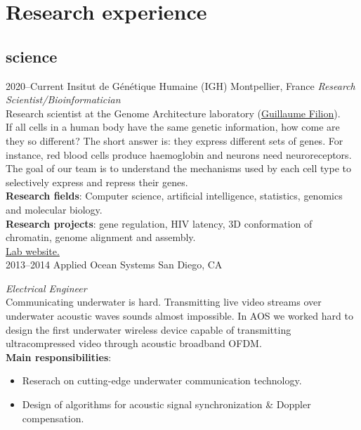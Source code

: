 \documentclass[]{friggeri-cv} %
\begin{document}

\section{Research experience}

\subsection{science}

\begin{entrylist}


\entry
{2020--Current}
{Insitut de Génétique Humaine (IGH)}
{Montpellier, France}
{%
\emph{Research Scientist/Bioinformatician} \\
Research scientist at the Genome Architecture laboratory
(\href{http://blog.thegrandlocus.com/}{Guillaume Filion}). \\
If all cells in a human body have the same genetic information, how come are
they so different? The short answer is:  they express different sets of genes.
For instance, red blood cells produce haemoglobin and neurons need neuroreceptors.
The goal of our team is to understand the mechanisms used by each cell type to
selectively express and repress their genes.\\
{\bf Research fields}: Computer science, artificial intelligence, statistics,
genomics and molecular biology. \\
{\bf Research projects}: gene regulation, HIV latency, 3D conformation of
chromatin, genome alignment and assembly.\\
\href{http://www.genomearchitecture.com}{{\FA \faExternalLink} Lab website.}
}\\


\entry
{2013--2014}
{Applied Ocean Systems}
{San Diego, CA}
{%
\emph{Electrical Engineer} \\
Communicating underwater is hard. Transmitting live video streams over underwater
acoustic waves sounds almost impossible. In AOS we worked hard to design the
first underwater wireless device capable of transmitting ultracompressed video
through acoustic broadband OFDM. \\
{\bf Main responsibilities}:
  \begin{itemize}
    \item Reserach on cutting-edge underwater communication technology.
    \item Design of algorithms for acoustic signal synchronization \& Doppler compensation.
  \end{itemize}
}\\


\end{entrylist}
\end{document}
